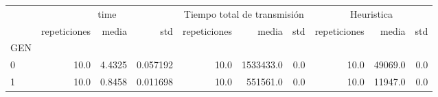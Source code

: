 \begin{tabular}{lrrrrrrrrr}
\toprule
{} & \multicolumn{3}{c}{time} & \multicolumn{3}{c}{Tiempo total de transmisión} & \multicolumn{3}{c}{Heuristica} \\
{} & repeticiones &   media &       std &                repeticiones &      media &  std & repeticiones &    media &  std \\
GEN &              &         &           &                             &            &      &              &          &      \\
\midrule
0   &         10.0 &  4.4325 &  0.057192 &                        10.0 &  1533433.0 &  0.0 &         10.0 &  49069.0 &  0.0 \\
1   &         10.0 &  0.8458 &  0.011698 &                        10.0 &   551561.0 &  0.0 &         10.0 &  11947.0 &  0.0 \\
\bottomrule
\end{tabular}
